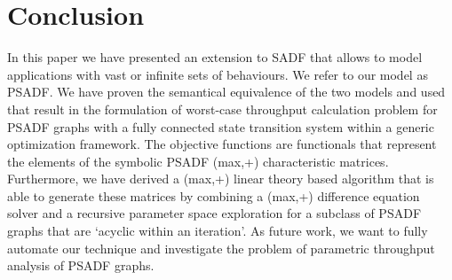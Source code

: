 \documentclass[]{eptcs}
\begin{document}
\section{Conclusion}
In this paper we have presented an extension to SADF that allows to model applications with vast or infinite sets of behaviours. We refer to our model as PSADF. We have proven the semantical equivalence of the two models and used that result in the formulation of worst-case throughput calculation problem for PSADF graphs with a fully connected state transition system within a generic optimization framework. The objective functions are functionals that represent the elements of the symbolic PSADF (max,+) characteristic matrices. Furthermore, we have derived a (max,+) linear theory based algorithm that is able to generate these matrices by combining a (max,+) difference equation solver and a recursive parameter space exploration for a subclass of PSADF graphs that are `acyclic within an iteration'. As future work, we want to fully automate our technique and investigate the problem of parametric throughput analysis of PSADF graphs.


\nocite{*}


\end{document}
